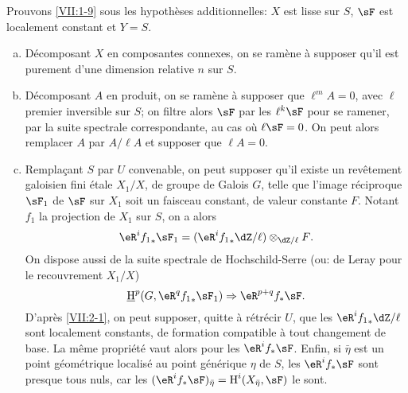 Prouvons \ref{VII:1-9} sous les hypoth\`eses additionnelles: $X$ est lisse sur 
$S$, $\sF$ est localement constant et $Y=S$. 
\begin{enumerate}[a)]
  \item D\'ecomposant $X$ en composantes connexes, on se ram\`ene \`a supposer 
    qu'il est purement d'une dimension relative $n$ sur $S$. 
  \item D\'ecomposant $A$ en produit, on se ram\`ene \`a supposer que 
    $\ell^m A=0$, avec $\ell$ premier inversible sur $S$; on filtre alors $\sF$ 
    par les $\ell^k \sF$ pour se ramener, par la suite spectrale 
    correspondante, au cas o\`u $\ell\sF=0$. On peut alors remplacer $A$ par 
    $A/\ell A$ et supposer que $\ell A=0$. 
  \item Remplaçant $S$ par $U$ convenable, on peut supposer qu'il existe un 
    rev\^etement galoisien fini \'etale $X_1/X$, de groupe de Galois $G$, telle 
    que l'image r\'eciproque $\sF_1$ de $\sF$ sur $X_1$ soit un faisceau 
    constant, de valeur constante $F$. Notant $f_1$ la projection de $X_1$ sur 
    $S$, on a alors 
    \[
      \eR^i {f_1}_\ast \sF_1 = (\eR^i {f_1}_\ast \dZ/\ell)\otimes_{\dZ/\ell} F \text{.} 
    \]
    On dispose aussi de la suite spectrale de Hochschild-Serre (ou: de Leray 
    pour le recouvrement $X_1/X$) 
    \[
      \underline\h^p(G,\eR^q {f_1}_\ast \sF_1) \Rightarrow \eR^{p+q} f_\ast \sF \text{.} 
    \]
    D'apr\`es \ref{VII:2-1}, on peut supposer, quitte \`a r\'etr\'ecir $U$, que 
    les $\eR^i {f_1}_\ast \dZ/\ell$ sont localement constants, de formation 
    compatible \`a tout changement de base. La m\^eme propri\'et\'e vaut alors 
    pour les $\eR^i f_\ast \sF$. Enfin, si $\bar\eta$ est un point 
    g\'eom\'etrique localis\'e au point g\'en\'erique $\eta$ de $S$, les 
    $\eR^i f_\ast\sF$ sont presque tous nuls, car les 
    $(\eR^i f_\ast \sF)_{\bar\eta} = \h^i(X_{\bar \eta},\sF)$ le sont. 
\end{enumerate}




